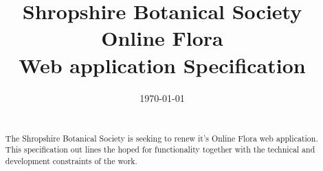 \documentclass[a4paper,12pt,landscape]{article}
\title{Shropshire Botanical Society Online Flora\\
Web application Specification}
\author{\documentauthor}
\date{\today}
\begin{document}
\maketitle
\begin{abstract}
  \begin{center}
    \begin{minipage}{0.5\textwidth}
      \strut\\
      The Shropshire Botanical Society is seeking
      to renew it's Online Flora web application.
      This specification out lines the hoped for functionality
      together with the technical
      and
      development constraints of the work.
    \end{minipage}
  \end{center}
\end{abstract}

\newpage%
\mbox{}
\clearpage
\end{document}
